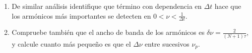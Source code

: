 \documentclass[11pt,spanish,a4paper]{article}
\begin{document}
\begin{enumerate}
\begin{enumerate}
	\item De similar análisis identifique que término con dependencia en \(\Delta t\) hace que los armónicos más importantes se detecten en \(0 < \nu < \frac{1}{\Delta t}\).

	\item Compruebe también que el ancho de banda de los armónicos es \(\delta \nu = \frac{2}{(N+1) \tau}\), y calcule cuanto más pequeño es que el $\Delta \nu$ entre sucesivos $\nu_p$.
\end{enumerate}



\end{enumerate}
\end{document}
